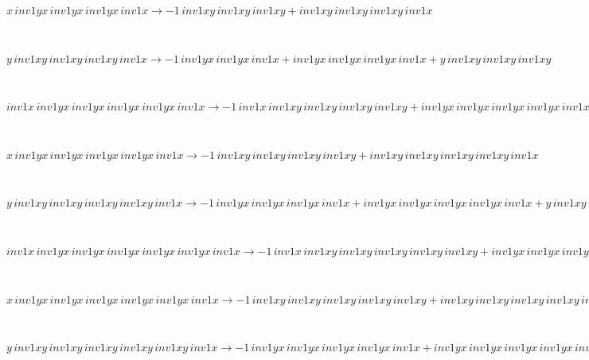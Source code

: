 \documentclass[rep10,leqno]{report}
\begin{document}
\begin{minipage}{6in}
$
x\,
 inv1yx\,
 inv1yx\,
 inv1yx\,
 inv1x\rightarrow -1\,
 inv1xy\,
 inv1xy\,
 inv1xy + inv1xy\,
 inv1xy\,
 inv1xy\,
 inv1x
$
\end{minipage}\medskip \\
\begin{minipage}{6in}
$
y\,
 inv1xy\,
 inv1xy\,
 inv1xy\,
 inv1x\rightarrow -1\,
 inv1yx\,
 inv1yx\,
 inv1x + inv1yx\,
 inv1yx\,
 inv1yx\,
 inv1x + y\,
 inv1xy\,
 inv1xy\,
 inv1xy
$
\end{minipage}\medskip \\
\begin{minipage}{6in}
$
inv1x\,
 inv1yx\,
 inv1yx\,
 inv1yx\,
 inv1yx\,
 inv1x\rightarrow -1\,
 inv1x\,
 inv1xy\,
 inv1xy\,
 inv1xy\,
 inv1xy + inv1yx\,
 inv1yx\,
 inv1yx\,
 inv1yx\,
 inv1x + inv1x\,
 inv1xy\,
 inv1xy\,
 inv1xy\,
 inv1xy\,
 inv1x
$
\end{minipage}\medskip \\
\begin{minipage}{6in}
$
x\,
 inv1yx\,
 inv1yx\,
 inv1yx\,
 inv1yx\,
 inv1x\rightarrow -1\,
 inv1xy\,
 inv1xy\,
 inv1xy\,
 inv1xy + inv1xy\,
 inv1xy\,
 inv1xy\,
 inv1xy\,
 inv1x
$
\end{minipage}\medskip \\
\begin{minipage}{6in}
$
y\,
 inv1xy\,
 inv1xy\,
 inv1xy\,
 inv1xy\,
 inv1x\rightarrow -1\,
 inv1yx\,
 inv1yx\,
 inv1yx\,
 inv1x + inv1yx\,
 inv1yx\,
 inv1yx\,
 inv1yx\,
 inv1x + y\,
 inv1xy\,
 inv1xy\,
 inv1xy\,
 inv1xy
$
\end{minipage}\medskip \\
\begin{minipage}{6in}
$
inv1x\,
 inv1yx\,
 inv1yx\,
 inv1yx\,
 inv1yx\,
 inv1yx\,
 inv1x\rightarrow -1\,
 inv1x\,
 inv1xy\,
 inv1xy\,
 inv1xy\,
 inv1xy\,
 inv1xy + inv1yx\,
 inv1yx\,
 inv1yx\,
 inv1yx\,
 inv1yx\,
 inv1x + inv1x\,
 inv1xy\,
 inv1xy\,
 inv1xy\,
 inv1xy\,
 inv1xy\,
 inv1x
$
\end{minipage}\medskip \\
\begin{minipage}{6in}
$
x\,
 inv1yx\,
 inv1yx\,
 inv1yx\,
 inv1yx\,
 inv1yx\,
 inv1x\rightarrow -1\,
 inv1xy\,
 inv1xy\,
 inv1xy\,
 inv1xy\,
 inv1xy + inv1xy\,
 inv1xy\,
 inv1xy\,
 inv1xy\,
 inv1xy\,
 inv1x
$
\end{minipage}\medskip \\
\begin{minipage}{6in}
$
y\,
 inv1xy\,
 inv1xy\,
 inv1xy\,
 inv1xy\,
 inv1xy\,
 inv1x\rightarrow -1\,
 inv1yx\,
 inv1yx\,
 inv1yx\,
 inv1yx\,
 inv1x + inv1yx\,
 inv1yx\,
 inv1yx\,
 inv1yx\,
 inv1yx\,
 inv1x + y\,
 inv1xy\,
 inv1xy\,
 inv1xy\,
 inv1xy\,
 inv1xy
$
\end{minipage}\medskip \\
\end{document}
